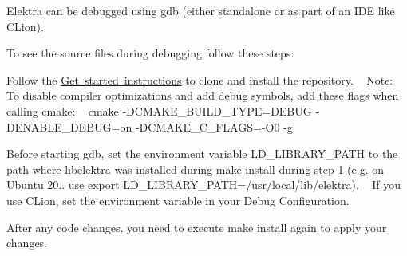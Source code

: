 \label{doc_DEBUGGING_md_md_doc_DEBUGGING}%
%
 Elektra can be debugged using gdb (either standalone or as part of an IDE like CLion).

To see the source files during debugging follow these steps\+:


\begin{DoxyEnumerate}
\item Follow the \mbox{\hyperlink{doc_GETSTARTED_md}{Get started instructions}} to clone and install the repository. ~\newline
 Note\+: To disable compiler optimizations and add debug symbols, add these flags when calling {\ttfamily cmake}\+: ~\newline
 {\ttfamily cmake -\/DCMAKE\+\_\+\+BUILD\+\_\+\+TYPE=DEBUG -\/DENABLE\+\_\+\+DEBUG=on -\/DCMAKE\+\_\+\+C\+\_\+\+FLAGS=-\/O0 -\/g}
\item Before starting gdb, set the environment variable {\ttfamily LD\+\_\+\+LIBRARY\+\_\+\+PATH} to the path where libelektra was installed during {\ttfamily make install} during step 1 (e.\+g. on Ubuntu 20.. use {\ttfamily export LD\+\_\+\+LIBRARY\+\_\+\+PATH=/usr/local/lib/elektra}). ~\newline
 If you use CLion, set the environment variable in your Debug Configuration.
\item After any code changes, you need to execute {\ttfamily make install} again to apply your changes. 
\end{DoxyEnumerate}
